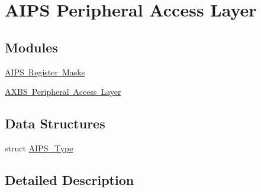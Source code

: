\hypertarget{group___a_i_p_s___peripheral___access___layer}{}\section{A\+I\+PS Peripheral Access Layer}
\label{group___a_i_p_s___peripheral___access___layer}
\subsection*{Modules}
\begin{DoxyCompactItemize}
\item 
\mbox{\hyperlink{group___a_i_p_s___register___masks}{A\+I\+P\+S Register Masks}}
\item 
\mbox{\hyperlink{group___a_x_b_s___peripheral___access___layer}{A\+X\+B\+S Peripheral Access Layer}}
\end{DoxyCompactItemize}
\subsection*{Data Structures}
\begin{DoxyCompactItemize}
\item 
struct \mbox{\hyperlink{struct_a_i_p_s___type}{A\+I\+P\+S\+\_\+\+Type}}
\end{DoxyCompactItemize}


\subsection{Detailed Description}
